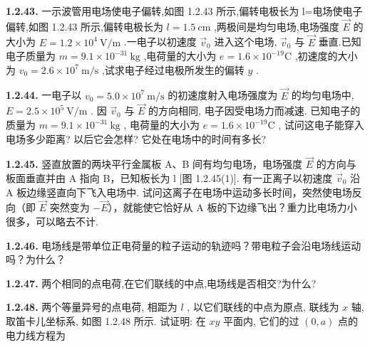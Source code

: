 \vfill

\newpage
\textbf{1.2.43.} 一示波管用电场使电子偏转,如图 1.2.43 所示,偏转电极长为 l=电场使电子偏转,如图 1.2.43 所示,偏转电极长为 $l = 1.5 \mathrm{~cm}$ ,两极间是均匀电场,电场强度 $\vec{E}$ 的大小为 $E = 1.2 \times 10^{4} \mathrm{~V} / \mathrm{m}$ .一电子以初速度 $\vec{v}_{0}$ 进入这个电场, $\vec{v}_{0}$ 与 $\vec{E}$ 垂直.已知电子质量为 $m = 9.1 \times 10^{-31} \mathrm{~kg}$ ,电荷量的大小为 $e = 1.6 \times 10^{-19} \mathrm{C}$ ,初速度的大小为 $v_{0} = 2.6 \times 10^{7} \mathrm{~m} / \mathrm{s}$ ,试求电子经过电极所发生的偏转 $y$ .


\begin{center}
\end{center}

\vfill

\textbf{1.2.44.} 一电子以 $v_0 = 5.0 \times 10^7 \mathrm{~m/s}$ 的初速度射入电场强度为 $\vec{E}$ 的均匀电场中, $E = 2.5 \times 10^5 \mathrm{~V/m}$ . 因 $\vec{v}_0$ 与 $\vec{E}$ 的方向相同, 电子因受电场力而减速. 已知电子的质量为 $m = 9.1 \times 10^{-31} \mathrm{~kg}$ , 电荷量的大小为 $e = 1.6 \times 10^{-19} \mathrm{C}$ , 试问这电子能穿入电场多少距离? 以后它会怎样? 它处在电场中的时间有多长?

\vfill

\newpage
\textbf{1.2.45.} 竖直放置的两块平行金属板 A、B 间有均匀电场，电场强度 $\vec{E}$ 的方向与板面垂直并由 A 指向 B，已知板长为 l [图 1.2.45(1)]. 有一正离子以初速度 $\vec{v}_{0}$ 沿 A 板边缘竖直向下飞入电场中. 试问这离子在电场中运动多长时间，突然使电场反向（即 $\vec{E}$ 突然变为 $-\vec{E}$），就能使它恰好从 A 板的下边缘飞出？重力比电场力小很多，可以略去不计.



\begin{center}
\end{center}


\vfill

\textbf{1.2.46.} 电场线是带单位正电荷量的粒子运动的轨迹吗？带电粒子会沿电场线运动吗？为什么？

\vfill

\newpage
\textbf{1.2.47.} 两个相同的点电荷,在它们联线的中点,电场线是否相交?为什么?

\vfill

\textbf{1.2.48.} 两个等量异号的点电荷, 相距为 $l$ , 以它们联线的中点为原点, 联线为 $x$ 轴, 取笛卡儿坐标系, 如图 1.2.48 所示. 试证明: 在 $xy$ 平面内, 它们的过 $(0, a)$ 点的电力线方程为

